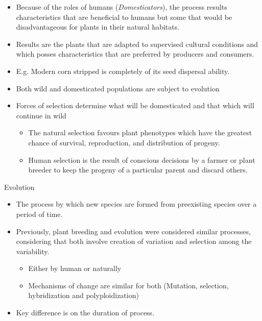 \documentclass[11pt,ignorenonframetext,aspectratio=169]{beamer}
\providecommand{\tightlist}{%
  \setlength{\itemsep}{0pt}\setlength{\parskip}{0pt}}
\begin{document}
\begin{frame}{}
\protect\hypertarget{section}{}
\begin{itemize}
\tightlist
\item
  Because of the roles of humans (\emph{Domesticators}), the process
  results characteristics that are beneficial to humans but some that
  would be disadvantageous for plants in their natural habitats.
\item
  Results are the plants that are adapted to supervised cultural
  conditions and which posses characteristics that are preferred by
  producers and consumers.
\item
  E.g. Modern corn stripped is completely of its seed dispersal ability.
\item
  Both wild and domesticated populations are subject to evolution
\item
  Forces of selection determine what will be domesticated and that which
  will continue in wild

  \begin{itemize}
  \tightlist
  \item
    The natural selection favours plant phenotypes which have the
    greatest chance of survival, reproduction, and distribution of
    progeny.
  \item
    Human selection is the result of conscious decisions by a farmer or
    plant breeder to keep the progeny of a particular parent and discard
    others.
  \end{itemize}
\end{itemize}
\end{frame}

\begin{frame}{Evolution}
\protect\hypertarget{evolution}{}
\begin{itemize}
\tightlist
\item
  The process by which new species are formed from preexisting species
  over a period of time.
\item
  Previously, plant breeding and evolution were considered similar
  processes, considering that both involve creation of variation and
  selection among the variability.

  \begin{itemize}
  \tightlist
  \item
    Either by human or naturally
  \item
    Mechanisms of change are similar for both (Mutation, selection,
    hybridization and polyploidization)
  \end{itemize}
\item
  Key difference is on the duration of process.
\end{itemize}
\end{frame}
\end{document}
